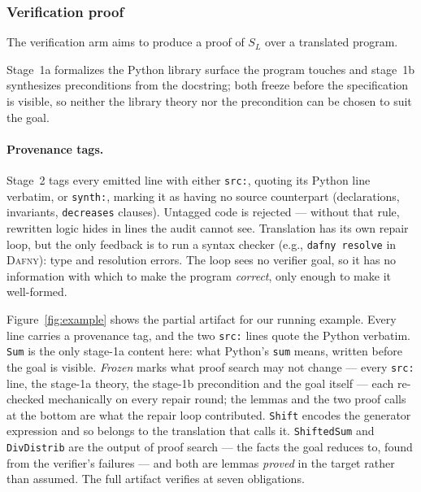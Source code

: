 \documentclass[11pt,letterpaper]{article}
\newcommand{\daf}{\textsc{Dafny}}
\begin{document}
\subsubsection{Verification proof}
\label{sec:verifproof}

The verification arm aims to produce a proof of $S_L$
over a translated program. 

Stage~1a formalizes the Python library surface the program touches and stage~1b
synthesizes preconditions from the docstring; both freeze before the
specification is visible, so neither the library theory nor the precondition can
be chosen to suit the goal.

\paragraph{Provenance tags.} Stage~2 tags every emitted line with either
\texttt{src:}, quoting its Python line verbatim, or \texttt{synth:}, marking it
as having no source counterpart (declarations, invariants, \texttt{decreases}
clauses). Untagged code is rejected --- without that rule, rewritten logic hides
in lines the audit cannot see. Translation has its own repair loop, but the only
feedback is to run a syntax checker (e.g., \texttt{dafny resolve} in \daf{}): 
type and resolution errors. The loop sees no verifier goal, so it has no information with which to
make the program \emph{correct}, only enough to make it well-formed.

Figure~\ref{fig:example} shows the partial artifact for our running example.
Every line carries a provenance tag, and the two \texttt{src:} lines
quote the Python verbatim. \texttt{Sum} is the only stage-1a content here:
what Python's \texttt{sum} means, written before the goal is visible.
\emph{Frozen} marks
what proof search may not change --- every \texttt{src:} line, the stage-1a
theory, the stage-1b precondition and the goal itself --- each re-checked
mechanically on every repair round; the lemmas and the two proof calls at the
bottom are what the repair loop contributed.
\texttt{Shift} encodes the generator expression and so belongs to the
translation that calls it. 
\texttt{ShiftedSum} and \texttt{DivDistrib}
are the output of proof search --- the facts the goal reduces to, found from the
verifier's failures --- and both are lemmas \emph{proved} in the target rather
than assumed. The full artifact verifies at seven obligations.
\end{document}
